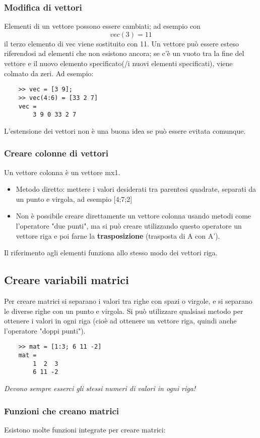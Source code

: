\documentclass[a4paper, 10pt]{article}
\begin{document}
\subsubsection{Modifica di vettori}
Elementi di un vettore possono essere cambiati; ad esempio con 
$$vec(3)=11$$ il terzo elemento di vec viene sostituito con 11.
Un vettore può essere esteso riferendosi ad elementi che non esistono ancora; se c'è un vuoto tra la fine del vettore e il nuovo elemento specificato(/i nuovi elementi specificati), viene colmato da zeri. Ad esempio:
\begin{lstlisting}
	>> vec = [3 9];
	>> vec(4:6) = [33 2 7]
	vec =
		3 9 0 33 2 7
\end{lstlisting}
L'estensione dei vettori non è una buona idea se può essere evitata comunque.

\subsubsection{Creare colonne di vettori}
Un vettore colonna è un vettore mx1.

\begin{itemize}
\item Metodo diretto: mettere i valori desiderati tra parentesi quadrate, separati da un punto e virgola, ad esempio [4;7;2]
\item Non è possibile creare direttamente un vettore colonna usando metodi come l'operatore "due punti", ma si può creare utilizzando questo operatore un vettore riga e poi farne la \textbf{trasposizione} (trasposta di A con A').
\end{itemize}
Il riferimento agli elementi funziona allo stesso modo dei vettori riga.

\subsection{Creare variabili matrici}
Per creare matrici si separano i valori tra righe con spazi o virgole, e si separano le diverse righe con un punto e virgola. Si può utilizzare qualsiasi metodo per ottenere i valori in ogni riga (cioè ad ottenere un vettore riga, quindi anche l'operatore "doppi punti").

\begin{lstlisting}
	>> mat = [1:3; 6 11 -2]
	mat =
		1  2  3
		6 11 -2
\end{lstlisting}
\emph{Devono sempre esserci gli stessi numeri di valori in ogni riga!}

\subsubsection{Funzioni che creano matrici}
Esistono molte funzioni integrate per creare matrici:
\end{document}
